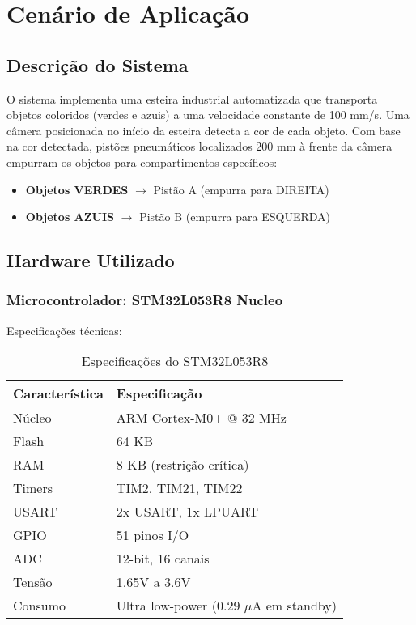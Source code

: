\documentclass[12pt,a4paper]{article}
\begin{document}
\section{Cenário de Aplicação}

\subsection{Descrição do Sistema}

O sistema implementa uma esteira industrial automatizada que transporta objetos coloridos (verdes e azuis) a uma velocidade constante de 100 mm/s. Uma câmera posicionada no início da esteira detecta a cor de cada objeto. Com base na cor detectada, pistões pneumáticos localizados 200 mm à frente da câmera empurram os objetos para compartimentos específicos:

\begin{itemize}
    \item \textbf{Objetos VERDES} $\rightarrow$ Pistão A (empurra para DIREITA)
    \item \textbf{Objetos AZUIS} $\rightarrow$ Pistão B (empurra para ESQUERDA)
\end{itemize}

\subsection{Hardware Utilizado}

\subsubsection{Microcontrolador: STM32L053R8 Nucleo}

Especificações técnicas:

\begin{table}[H]
\centering
\begin{tabularx}{\textwidth}{lX}
\toprule
\textbf{Característica} & \textbf{Especificação} \\
\midrule
Núcleo & ARM Cortex-M0+ @ 32 MHz \\
Flash & 64 KB \\
RAM & 8 KB (restrição crítica) \\
Timers & TIM2, TIM21, TIM22 \\
USART & 2x USART, 1x LPUART \\
GPIO & 51 pinos I/O \\
ADC & 12-bit, 16 canais \\
Tensão & 1.65V a 3.6V \\
Consumo & Ultra low-power (0.29 $\mu$A em standby) \\
\bottomrule
\end{tabularx}
\caption{Especificações do STM32L053R8}
\end{table}
\end{document}
